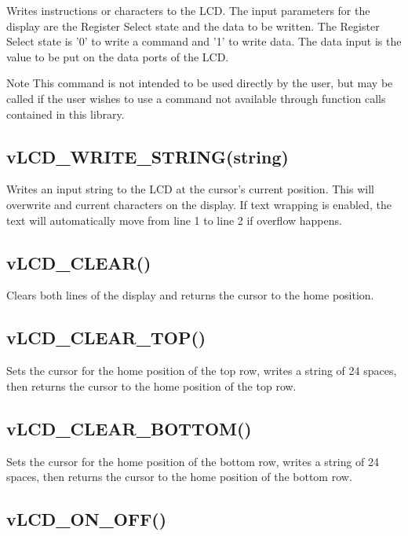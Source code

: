 Writes instructions or characters to the L\-C\-D. The input parameters for the display are the Register Select state and the data to be written. The Register Select state is '0' to write a command and '1' to write data. The data input is the value to be put on the data ports of the L\-C\-D. \begin{DoxyNote}{Note}
This command is not intended to be used directly by the user, but may be called if the user wishes to use a command not available through function calls contained in this library.
\end{DoxyNote}
\hypertarget{_usage_write_string}{}\subsection{v\-L\-C\-D\-\_\-\-W\-R\-I\-T\-E\-\_\-\-S\-T\-R\-I\-N\-G(string)}\label{_usage_write_string}
Writes an input string to the L\-C\-D at the cursor's current position. This will overwrite and current characters on the display. If text wrapping is enabled, the text will automatically move from line 1 to line 2 if overflow happens.\hypertarget{_test_plans_clear}{}\subsection{v\-L\-C\-D\-\_\-\-C\-L\-E\-A\-R()}\label{_test_plans_clear}
Clears both lines of the display and returns the cursor to the home position.\hypertarget{_test_plans_clear_top}{}\subsection{v\-L\-C\-D\-\_\-\-C\-L\-E\-A\-R\-\_\-\-T\-O\-P()}\label{_test_plans_clear_top}
Sets the cursor for the home position of the top row, writes a string of 24 spaces, then returns the cursor to the home position of the top row.\hypertarget{_test_plans_clear_bottom}{}\subsection{v\-L\-C\-D\-\_\-\-C\-L\-E\-A\-R\-\_\-\-B\-O\-T\-T\-O\-M()}\label{_test_plans_clear_bottom}
Sets the cursor for the home position of the bottom row, writes a string of 24 spaces, then returns the cursor to the home position of the bottom row.\hypertarget{_test_plans_onoff}{}\subsection{v\-L\-C\-D\-\_\-\-O\-N\-\_\-\-O\-F\-F()}\label{_test_plans_onoff}
